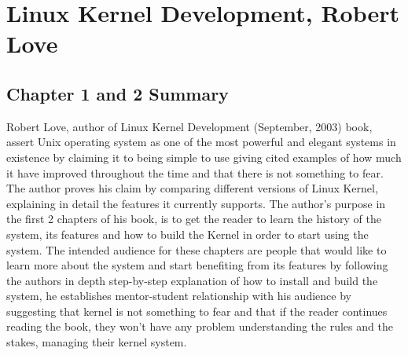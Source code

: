 \documentclass[letterpaper,10pt,titlepage]{article}
\begin{document}
\section*{Linux Kernel Development, Robert Love}
\subsection*{Chapter 1 and 2 Summary}

Robert Love, author of Linux Kernel Development (September, 2003) book, assert Unix operating system as one of the most powerful and elegant systems in existence by claiming it to being simple to use giving cited examples of how much it have improved throughout the time and that there is not something to fear. The author proves his claim by comparing different versions of Linux Kernel, explaining in detail the features it currently supports. The author’s purpose in the first 2 chapters of his book, is to get the reader to learn the history of the system, its features and how to build the Kernel in order to start using the system. The intended audience for these chapters are people that would like to learn more about the system and start benefiting from its features by following the authors in depth step-by-step explanation of how to install and build the system, he establishes mentor-student relationship with his audience by suggesting that kernel is not something to fear and that if the reader continues reading the book, they won’t have any problem understanding the rules and the stakes, managing their kernel system.
\end{document}
